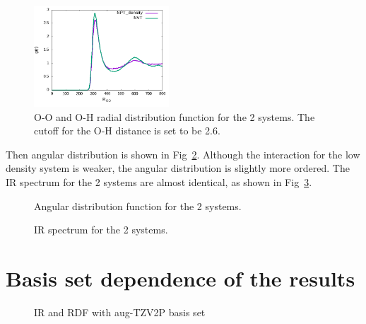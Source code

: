 \documentclass[aps,prl,reprint,amsmath,amssymb]{revtex4-1}
\begin{document}
\begin{figure}
\includegraphics[width=0.45\textwidth]{rdf_NVT_CPDNVT.png}
\caption{O-O and O-H radial distribution function for the 2 systems. The cutoff for the O-H distance is set to be 2.6\Ang.}\label{Fig:rdf_cp}
\end{figure} 

Then angular distribution is shown in Fig~\ref{Fig:adfcp}. 
Although the interaction for the low density system is weaker, the angular distribution is slightly more ordered. 
The IR spectrum for the 2 systems are almost identical, as shown in Fig~\ref{Fig:ir_cp}.

\begin{figure}
\caption{Angular distribution function for the 2 systems.}\label{Fig:adfcp}
\end{figure} 

\begin{figure}
\caption{IR spectrum for the 2 systems.}\label{Fig:ir_cp}
\end{figure} 

\section{Basis set dependence of the results} 

\begin{figure}
\caption{IR and RDF with aug-TZV2P basis set}\label{Fig:basis}
\end{figure} 


\fi %
\end{document}
